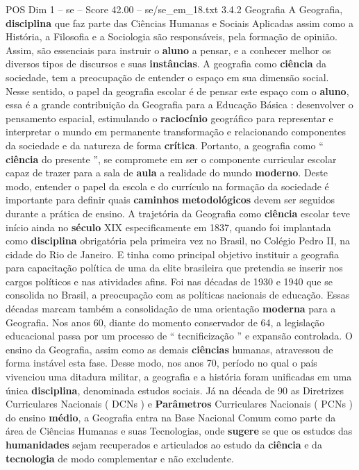 \begin{textsample}{POS Dim 1 – se – Score 42.00 – se/se\_em\_18.txt}  \label{ex:f1_pos_088}
3.4.2 Geografia A Geografia, \textbf{disciplina} que faz parte das Ciências Humanas e Sociais Aplicadas assim como a História, a Filosofia e a Sociologia são responsáveis, pela formação de opinião.
Assim, são essenciais para instruir o \textbf{aluno} a pensar, e a conhecer melhor os diversos tipos de discursos e suas \textbf{instâncias}.
A geografia como \textbf{ciência} da sociedade, tem a preocupação de entender o espaço em sua dimensão social.
Nesse sentido, o papel da geografia escolar é de pensar este espaço com o \textbf{aluno}, essa é a grande contribuição da Geografia para a Educação Básica : desenvolver o pensamento espacial, estimulando o \textbf{raciocínio} geográfico para representar e interpretar o mundo em permanente transformação e relacionando componentes da sociedade e da natureza de forma \textbf{crítica}.
Portanto, a geografia como “ \textbf{ciência} do presente ”, se compromete em ser o componente curricular escolar capaz de trazer para a sala de \textbf{aula} a realidade do mundo \textbf{moderno}.
Deste modo, entender o papel da escola e do currículo na formação da sociedade é importante para definir quais \textbf{caminhos} \textbf{metodológicos} devem ser seguidos durante a prática de ensino.
A trajetória da Geografia como \textbf{ciência} escolar teve início ainda no \textbf{século} XIX especificamente em 1837, quando foi implantada como \textbf{disciplina} obrigatória pela primeira vez no Brasil, no Colégio Pedro II, na cidade do Rio de Janeiro.
E tinha como principal objetivo instituir a geografia para capacitação política de uma da elite brasileira que pretendia se inserir nos cargos políticos e nas atividades afins.
Foi nas décadas de 1930 e 1940 que se consolida no Brasil, a preocupação com as políticas nacionais de educação.
Essas décadas marcam também a consolidação de uma orientação \textbf{moderna} para a Geografia.
Nos anos 60, diante do momento conservador de 64, a legislação educacional passa por um processo de “ tecnificização ” e expansão controlada.
O ensino da Geografia, assim como as demais \textbf{ciências} humanas, atravessou de forma instável esta fase.
Desse modo, nos anos 70, período no qual o país vivenciou uma ditadura militar, a geografia e a história foram unificadas em uma única \textbf{disciplina}, denominada estudos sociais.
Já na década de 90 as Diretrizes Curriculares Nacionais ( DCNs ) e \textbf{Parâmetros} Curriculares Nacionais ( PCNs ) do ensino \textbf{médio}, a Geografia entra na Base Nacional Comum como parte da área de Ciências Humanas e suas Tecnologias, onde \textbf{sugere} se que os estudos das \textbf{humanidades} sejam recuperados e articulados ao estudo da \textbf{ciência} e da \textbf{tecnologia} de modo complementar e não excludente.

\end{textsample}
